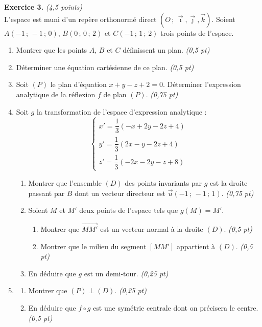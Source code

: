 \smallskip
\noindent\textbf{Exercice 3.} \hfill\textit{(4,5 points)}\\
L'espace est muni d'un repère orthonormé direct $(O\,;\,\vec\imath,\vec\jmath,\vec k)$.
Soient $A(-1\,;\,-1\,;\,0)$, $B(0\,;\,0\,;\,2)$ et $C(-1\,;\,1\,;\,2)$ trois points de l'espace.
\begin{enumerate}[label=\arabic*)]
\item Montrer que les points $A$, $B$ et $C$ définissent un plan. \hfill\textit{(0,5 pt)}
\item Déterminer une équation cartésienne de ce plan. \hfill\textit{(0,5 pt)}
\item Soit $(P)$ le plan d'équation $x+y-z+2=0$. Déterminer l'expression analytique de la
réflexion $f$ de plan $(P)$. \hfill\textit{(0,75 pt)}
\item Soit $g$ la transformation de l'espace d'expression analytique :
\[
\begin{cases}
x'=\dfrac13(-x+2y-2z+4)\\[4pt]
y'=\dfrac13(2x-y-2z+4)\\[4pt]
z'=\dfrac13(-2x-2y-z+8)
\end{cases}
\]
  \begin{enumerate}[label=\alph*)]
  \item Montrer que l'ensemble $(D)$ des points invariants par $g$ est la droite passant par
  $B$ dont un vecteur directeur est $\vec u(-1\,;\,-1\,;\,1)$. \hfill\textit{(0,75 pt)}
  \item Soient $M$ et $M'$ deux points de l'espace tels que $g(M)=M'$.
    \begin{enumerate}[label=\roman*)]
    \item Montrer que $\overrightarrow{MM'}$ est un vecteur normal à la droite $(D)$. \hfill\textit{(0,5 pt)}
    \item Montrer que le milieu du segment $[MM']$ appartient à $(D)$. \hfill\textit{(0,5 pt)}
    \end{enumerate}
  \item En déduire que $g$ est un demi-tour. \hfill\textit{(0,25 pt)}
  \end{enumerate}
\item
  \begin{enumerate}[label=\alph*)]
  \item Montrer que $(P)\perp(D)$. \hfill\textit{(0,25 pt)}
  \item En déduire que $f\circ g$ est une symétrie centrale dont on précisera le centre. \hfill\textit{(0,5 pt)}
  \end{enumerate}
\end{enumerate}

